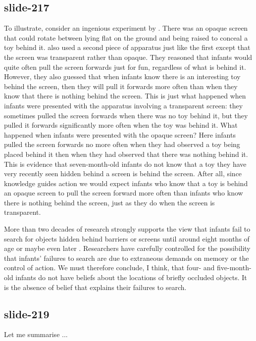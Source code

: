 \documentclass[12pt,\papersize]{extarticle}
\begin{document}
\subsection{slide-217}
To illustrate, consider an ingenious experiment by \citet{Shinskey:2001fk}.
There was an opaque screen that could rotate between lying flat on the ground and being raised to conceal a toy behind it.
\citeauthor{Shinskey:2001fk} also used a second piece of apparatus just like the first except that the screen was transparent rather than opaque.
They reasoned that infants would quite often pull the screen forwards just for fun, regardless of what is behind it.
However, they also guessed that when infants know there is an interesting toy behind the screen, then they will pull it forwards more often than when they know that there is nothing behind the screen.
This is just what happened when infants were presented with the apparatus involving a transparent screen:
they sometimes pulled the screen forwards when there was no toy behind it, but they pulled it forwards significantly more often when the toy was behind it.
What happened  when infants were presented with the opaque screen?
Here infants pulled the screen forwards no more often when they had observed a toy being placed behind it then when they had observed that there was nothing behind it.
This is evidence that  seven-month-old infants do not know that a toy they have very recently seen hidden behind a screen is behind the screen.
After all, since knowledge guides action we would expect infants who know that a toy is behind an opaque screen to pull the screen forward more often than infants who know there is nothing behind the screen, just as they do when the screen is transparent.

More than two decades of research strongly supports the view that
infants fail to search for objects hidden behind barriers or screens
until around eight months of age \citep[p.\ 202]{Meltzoff:1998wp} or
maybe even later \citep{moore:2008_factors}.
Researchers have carefully controlled for the possibility that infants’
failures to search are due to extraneous demands on memory or the
control of action.
We must therefore conclude, I think, that four- and five-month-old
infants do not have beliefs about the locations of briefly occluded
objects.
It is the absence of belief that explains their failures to search.

\subsection{slide-219}
Let me summarise ...
\end{document}
